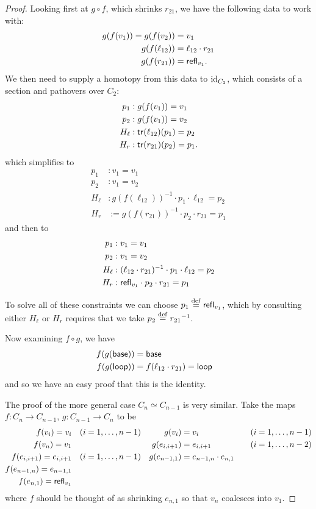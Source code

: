 \begin{proof}
Looking first at \( g\circ f \), which shrinks \( r_{21} \), we have the following data to work with:
\begin{align*}
g(f(v_1))=g(f(v_2))&=v_1\\
g(f(\ell_{12}))&=\ell_{12}\cdot r_{21}\\
g(f(r_{21})) &= \mathsf{refl}_{v_1}.
\end{align*}
We then need to supply a homotopy from this data to \( \text{id}_{C_2} \), which consists of a section and pathovers over \( C_2 \):
\begin{align*}
p_1&:g(f(v_1))=v_1\\
p_2&:g(f(v_1))=v_2\\
H_\ell&:\mathsf{tr}(\ell_{12})(p_1)=p_2\\
H_r&:\mathsf{tr}(r_{21})(p_2)=p_1.
\end{align*}
which simplifies to
\begin{align*}
p_1&:v_1=v_1\\
p_2&:v_1=v_2\\
H_\ell&:g(f(\ell_{12}))^{-1}\cdot p_1\cdot \ell_{12}=p_2\\
H_r&:=g(f(r_{21}))^{-1}\cdot p_2\cdot r_{21}= p_1
\end{align*}
and then to 
\begin{align*}
p_1&:v_1=v_1\\
p_2&:v_1=v_2\\
H_\ell&:(\ell_{12}\cdot r_{21})^{-1}\cdot p_1\cdot \ell_{12}=p_2\\
H_r&:\mathsf{refl}_{v_1}\cdot p_2\cdot r_{21}= p_1
\end{align*}

To solve all of these constraints we can choose \( p_1\stackrel{\mathrm{def}}{=}\mathsf{refl}_{v_1} \), which by consulting either \( H_\ell \) or \( H_r \) requires that we take \( p_2\stackrel{\mathrm{def}}{=}{r_{21}}^{-1}\).

Now examining \( f\circ g \), we have
\begin{align*}
f(g(\mathsf{base}))&=\mathsf{base}&\\
f(g(\mathsf{loop}))&=f(\ell_{12}\cdot r_{21})=\mathsf{loop}
\end{align*}
and so we have an easy proof that this is the identity.

The proof of the more general case \( C_n \simeq C_{n-1}\) is very similar. Take the maps \( f:C_n\to C_{n-1} \), \( g:C_{n-1}\to C_n \) to be
\begin{align*}
f(v_i)=v_i&\quad(i=1,\ldots,n-1) & g(v_i)&=v_i&\quad(i=1,\ldots,n-1)\\
f(v_n)=v_1&\quad& g(e_{i,i+1})&=e_{i,i+1}&\quad(i=1,\ldots,n-2)\\
f(e_{i,i+1})=e_{i,i+1}&\quad(i=1,\ldots,n-1)& g(e_{n-1,1})&=e_{n-1,n}\cdot e_{n,1}&\\
f(e_{n-1,n})=e_{n-1,1}&&&&\\
f(e_{n,1})=\mathsf{refl}_{v_1}&&&&
\end{align*}
where \( f \) should be thought of as shrinking \( e_{n,1} \) so that \( v_n \) coalesces into \( v_1 \).


\end{proof}
